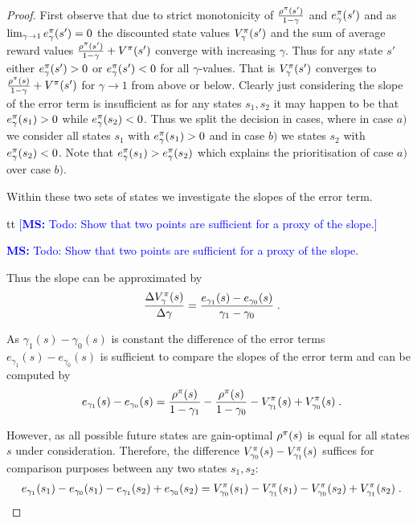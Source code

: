 \documentclass[envcountsame]{llncs}
\newcommand\MS[2][r]{\ifx t#1 \textcolor{blue}{[\textbf{MS:} #2]}
  \else \begin{center}\textcolor{blue}{\textbf{MS:} #2} \end{center} \fi}
\begin{document}
\begin{proof}
  First observe that due to strict monotonicity of \(\frac{\rho^{\pi}(s')}{1-\gamma}\) and
  \(e_{\gamma}^{\pi}(s')\) and as \(\lim_{\gamma \to 1} e_{\gamma}^{\pi}(s') = 0\) the discounted
  state values \(V_{\gamma}^{\pi}(s')\) and the sum of average reward values
  \(\frac{\rho^{\pi}(s')}{1-\gamma} + V^{\pi}(s')\) converge with increasing \(\gamma\).
  Thus for any state \(s'\) either \(e_{\gamma}^{\pi}(s') > 0\) or \(e_{\gamma}^{\pi}(s') < 0\)
  for all \(\gamma\)-values. That is \(V_{\gamma}^{\pi}(s')\) converges to
  \(\frac{\rho^{\pi}(s)}{1-\gamma} + V^{\pi}(s')\) for \(\gamma \to 1\) from above or below.
  Clearly just considering the slope of the error term is insufficient as for any states
  \(s_{1}, s_{2}\) it may happen to be that \(e_{\gamma}^{\pi}(s_{1}) > 0\) while
  \(e_{\gamma}^{\pi}(s_{2}) < 0\). Thus we split the decision in cases, where in case \(a)\) we
  consider all states \(s_{1}\) with \(e_{\gamma}^{\pi}(s_{1}) > 0\) and in case \(b)\) we states
  \(s_{2}\) with \(e_{\gamma}^{\pi}(s_{2}) < 0\). Note that
  \(e_{\gamma}^{\pi}(s_{1}) > e_{\gamma}^{\pi}(s_{2})\) which explains the prioritisation of case
  \(a)\) over case \(b)\).

  Within these two sets of states we investigate the slopes of the error term.

  \MS[t]{Todo: Show that two points are sufficient for a proxy of the slope.}
  Thus the slope can be approximated by
  \begin{align*}
    \frac{\Delta V_{\gamma}^{\pol}(s)}{\Delta \gamma} = \frac{e_{\gamma_{1}}(s) - e_{\gamma_0}(s)}{\gamma_{1} - \gamma_{0}} \tpkt
  \end{align*}

  As \(\gamma_{1}(s)-\gamma_{0}(s)\) is constant the difference of the error terms
  \(e_{\gamma_{1}}(s) - e_{\gamma_0}(s)\) is sufficient to compare the slopes of the error term and
  can be computed by
  \begin{align}
    \label{eq:errorAvgRew}
    e_{\gamma_{1}}(s) - e_{\gamma_0}(s) = \frac{\avgrew^{\pol}(s)}{1-\gamma_{1}} -
    \frac{\avgrew^{\pol}(s)}{1-\gamma_{0}} - V_{\gamma_{1}}^{\pol}(s) + V_{\gamma_{0}}^{\pol}(s)\tpkt
  \end{align}

  However, as all possible future states are gain-optimal \(\rho^{\pi}(s)\) is equal for all
  states \(s\) under consideration. Therefore, the difference \(V_{\gamma_{0}}^{\pi}(s) -
  V_{\gamma_{1}}^{\pi}(s)\) suffices for comparison purposes between any two states \(s_{1}, s_{2}\):
  \begin{align*}
  e_{\gamma_{1}}(s_{1}) - e_{\gamma_0}(s_{1}) - e_{\gamma_{1}}(s_{2}) + e_{\gamma_0}(s_{2}) =
    V_{\gamma_{0}}^{\pol}(s_1) - V_{\gamma_{1}}^{\pol}(s_1) - V_{\gamma_{0}}^{\pol}(s_2) + V_{\gamma_{1}}^{\pol}(s_2)\tpkt\\
  \end{align*}



\end{proof}
\end{document}
